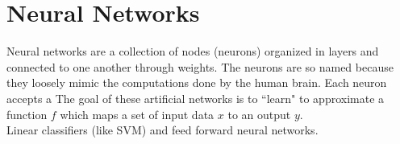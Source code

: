 \documentclass[12pt]{article}
\begin{document}
\section{Neural Networks}
Neural networks are a collection of nodes (neurons) organized in layers and connected to one another through weights. The neurons are so named because they loosely mimic the computations done by the human brain. Each neuron accepts a  The goal of these artificial networks is to ``learn" to approximate a function $f$ which maps a set of input data $x$ to an output $y$.  \\
Linear classifiers (like SVM) and feed forward neural networks.
\end{document}

